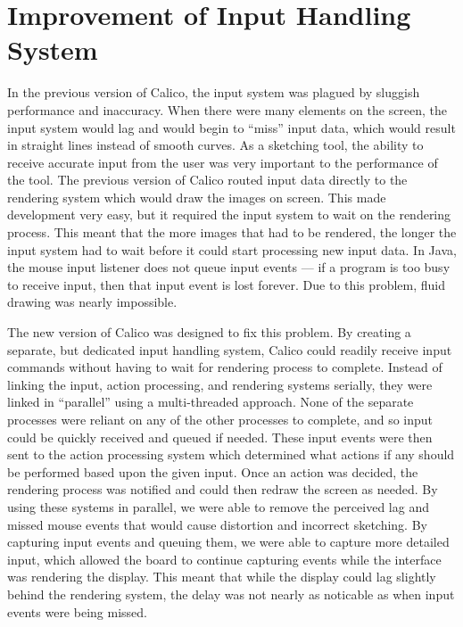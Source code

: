 
\section{Improvement of Input Handling System}
In the previous version of Calico, the input system was plagued by sluggish performance and inaccuracy. When there were many elements on the screen, the input system would lag and would begin to ``miss'' input data, which would result in straight lines instead of smooth curves. As a sketching tool, the ability to receive accurate input from the user was very important to the performance of the tool. The previous version of Calico routed input data directly to the rendering system which would draw the images on screen. This made development very easy, but it required the input system to wait on the rendering process. This meant that the more images that had to be rendered, the longer the input system had to wait before it could start processing new input data. In Java, the mouse input listener does not queue input events --- if a program is too busy to receive input, then that input event is lost forever. Due to this problem, fluid drawing was nearly impossible.   

The new version of Calico was designed to fix this problem. By creating a separate, but dedicated input handling system, Calico could readily receive input commands without having to wait for rendering process to complete.
Instead of linking the input, action processing, and rendering systems serially, they were linked in ``parallel'' using a multi-threaded approach. None of the separate processes were reliant on any of the other processes to complete, and so input could be quickly received and queued if needed. These input events were then sent to the action processing system which determined what actions if any should be performed based upon the given input. Once an action was decided, the rendering process was notified and could then redraw the screen as needed. By using these systems in parallel, we were able to remove the perceived lag and missed mouse events that would cause distortion and incorrect sketching. By capturing input events and queuing them, we were able to capture more detailed input, which allowed the board to continue capturing events while the interface was rendering the display. This meant that while the display could lag slightly behind the rendering system, the delay was not nearly as noticable as when input events were being missed. 

